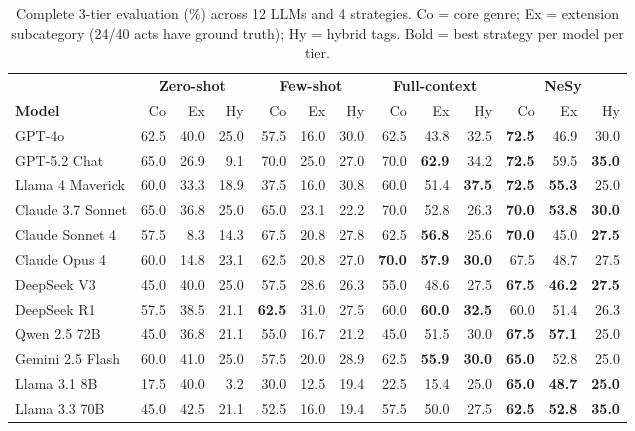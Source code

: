 \documentclass[10pt, a4paper]{article}
\begin{document}
\begin{table}[t]
\centering
\small
\setlength{\tabcolsep}{4pt}
\begin{tabular}{l rrr rrr rrr rrr}
\toprule
& \multicolumn{3}{c}{\textbf{Zero-shot}} & \multicolumn{3}{c}{\textbf{Few-shot}} & \multicolumn{3}{c}{\textbf{Full-context}} & \multicolumn{3}{c}{\textbf{NeSy}} \\
\cmidrule(lr){2-4} \cmidrule(lr){5-7} \cmidrule(lr){8-10} \cmidrule(lr){11-13}
\textbf{Model} & Co & Ex & Hy & Co & Ex & Hy & Co & Ex & Hy & Co & Ex & Hy \\
\midrule
GPT-4o            & 62.5 & 40.0 & 25.0 & 57.5 & 16.0 & 30.0 & 62.5 & 43.8 & 32.5 & \textbf{72.5} & 46.9 & 30.0 \\
GPT-5.2 Chat      & 65.0 & 26.9 &  9.1 & 70.0 & 25.0 & 27.0 & 70.0 & \textbf{62.9} & 34.2 & \textbf{72.5} & 59.5 & \textbf{35.0} \\
Llama 4 Maverick  & 60.0 & 33.3 & 18.9 & 37.5 & 16.0 & 30.8 & 60.0 & 51.4 & \textbf{37.5} & \textbf{72.5} & \textbf{55.3} & 25.0 \\
Claude 3.7 Sonnet & 65.0 & 36.8 & 25.0 & 65.0 & 23.1 & 22.2 & 70.0 & 52.8 & 26.3 & \textbf{70.0} & \textbf{53.8} & \textbf{30.0} \\
Claude Sonnet 4   & 57.5 &  8.3 & 14.3 & 67.5 & 20.8 & 27.8 & 62.5 & \textbf{56.8} & 25.6 & \textbf{70.0} & 45.0 & \textbf{27.5} \\
Claude Opus 4     & 60.0 & 14.8 & 23.1 & 62.5 & 20.8 & 27.0 & \textbf{70.0} & \textbf{57.9} & \textbf{30.0} & 67.5 & 48.7 & 27.5 \\
DeepSeek V3       & 45.0 & 40.0 & 25.0 & 57.5 & 28.6 & 26.3 & 55.0 & 48.6 & 27.5 & \textbf{67.5} & \textbf{46.2} & \textbf{27.5} \\
DeepSeek R1       & 57.5 & 38.5 & 21.1 & \textbf{62.5} & 31.0 & 27.5 & 60.0 & \textbf{60.0} & \textbf{32.5} & 60.0 & 51.4 & 26.3 \\
Qwen 2.5 72B      & 45.0 & 36.8 & 21.1 & 55.0 & 16.7 & 21.2 & 45.0 & 51.5 & 30.0 & \textbf{67.5} & \textbf{57.1} & 25.0 \\
Gemini 2.5 Flash  & 60.0 & 41.0 & 25.0 & 57.5 & 20.0 & 28.9 & 62.5 & \textbf{55.9} & \textbf{30.0} & \textbf{65.0} & 52.8 & 25.0 \\
Llama 3.1 8B      & 17.5 & 40.0 &  3.2 & 30.0 & 12.5 & 19.4 & 22.5 & 15.4 & 25.0 & \textbf{65.0} & \textbf{48.7} & \textbf{25.0} \\
Llama 3.3 70B     & 45.0 & 42.5 & 21.1 & 52.5 & 16.0 & 19.4 & 57.5 & 50.0 & 27.5 & \textbf{62.5} & \textbf{52.8} & \textbf{35.0} \\
\bottomrule
\end{tabular}
\caption{Complete 3-tier evaluation (\%) across 12 LLMs and 4 strategies. Co = core genre; Ex = extension subcategory (24/40 acts have ground truth); Hy = hybrid tags. Bold = best strategy per model per tier.}
\label{tab:full_results}
\end{table}
\end{document}
